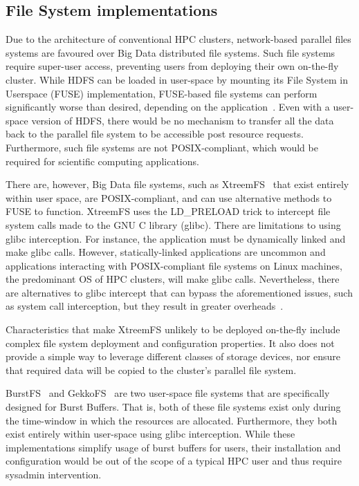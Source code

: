 \documentclass[10pt,journal,compsoc]{IEEEtran}
\begin{document}
\subsection{File System implementations}
      Due to the architecture of conventional HPC clusters, network-based
      parallel files systems are favoured over Big Data distributed file
      systems. Such file systems require super-user access, preventing users
      from deploying their own on-the-fly cluster. While HDFS can be loaded
      in user-space by mounting its File System in Userspace (FUSE)
      implementation, FUSE-based file systems can perform significantly worse
      than desired, depending on the application~\cite{tofuse}. Even with a
      user-space version of HDFS, there would be no mechanism to transfer all
      the data back to the parallel file system to be accessible post resource
      requests. Furthermore, such file systems are not POSIX-compliant, which
      would be required for scientific computing applications.
      
      There are, however, Big Data file systems, such as
      XtreemFS~\cite{xtreemfs} that exist entirely within user space, are
      POSIX-compliant, and can use alternative methods to FUSE to function.
      XtreemFS uses the LD\_PRELOAD trick to intercept file system calls made to
      the GNU C library (glibc). There are limitations to using glibc
      interception. For instance, the application must be dynamically linked and
      make glibc calls. However, statically-linked applications are uncommon and
      applications interacting with POSIX-compliant file systems on Linux
      machines, the predominant OS of HPC clusters, will make glibc calls.
      Nevertheless, there are alternatives to glibc intercept that can bypass
      the aforementioned issues, such as system call interception, but they
      result in greater overheads~\cite{quinson}.

      Characteristics that make XtreemFS unlikely to be deployed on-the-fly
      include complex file system deployment and configuration properties. It
      also does not provide a simple way to leverage different classes of
      storage devices, nor ensure that required data will be copied to the
      cluster's parallel file system.

      BurstFS~\cite{burstfs} and GekkoFS~\cite{gekkofs} are two user-space file
      systems that are specifically designed for Burst Buffers. That is, both of
      these file systems exist only during the time-window in which the
      resources are allocated. Furthermore, they both exist entirely within
      user-space using glibc interception. While these implementations simplify
      usage of burst buffers for users, their installation and configuration would be out of the
      scope of a typical HPC user and thus require sysadmin intervention.
\end{document}
